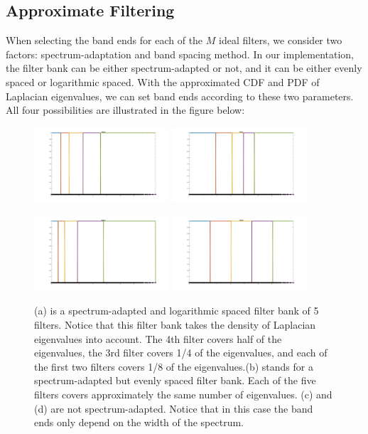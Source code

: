 \documentclass[a4paper]{article}
\theoremstyle{definition}
\begin{document}
\subsection{Approximate Filtering}

When selecting the band ends for each of the $M$ ideal filters, we consider two factors: spectrum-adaptation and band spacing method. In our implementation, the filter bank can be either spectrum-adapted or not, and it can be either evenly spaced or logarithmic spaced. With the approximated CDF and PDF of Laplacian eigenvalues, we can set band ends according to these two parameters. All four possibilities are illustrated in the figure below:

\begin{figure}[h]
\centering
\includegraphics[width = 5cm]{filter_bank_1}
\includegraphics[width = 5cm]{filter_bank_2}

\includegraphics[width = 5cm]{filter_bank_4}
\includegraphics[width = 5cm]{filter_bank_3}


\caption{(a) is a spectrum-adapted and logarithmic spaced filter bank of 5 filters. Notice that this filter bank takes the density of Laplacian eigenvalues into account. The 4th filter covers half of the eigenvalues, the 3rd filter covers 1/4 of the eigenvalues, and each of the first two filters covers 1/8 of the eigenvalues.(b) stands for a spectrum-adapted but evenly spaced filter bank. Each of the five filters covers approximately the same number of eigenvalues. (c) and (d) are not spectrum-adapted. Notice that in this case the band ends only depend on the width of the spectrum.}
\end{figure}
\end{document}
